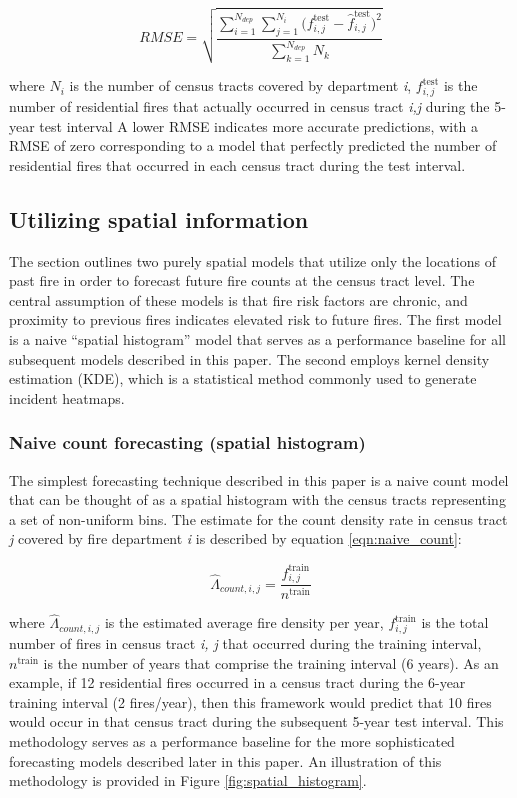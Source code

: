 \documentclass{svjour3}
\begin{document}
\begin{equation}
  \label{eqn:deviance}
  RMSE = \sqrt{
  \frac{\sum_{i=1}^{N_{dep}}\sum_{j=1}^{N_i}\bigg(
  f^{\text{test}}_{i,j} - \hat{f}^{\text{test}}_{i,j}\bigg)^2}{\sum_{k=1}^{N_{dep}}{N_k}}}
\end{equation}

\noindent where $N_i$ is the number of census tracts covered by department \textit{i}, $f^{\text{test}}_{i,j}$ is the number of residential fires that actually occurred in census tract \textit{i,j} during the 5-year test interval A lower RMSE indicates more accurate predictions, with a RMSE of zero corresponding to a model that perfectly predicted the number of residential fires that occurred in each census tract during the test interval.


\subsection{Utilizing spatial information}
The section outlines two purely spatial models that utilize only the locations of past fire in order to forecast future fire counts at the census tract level. The central assumption of these models is that fire risk factors are chronic, and proximity to previous fires indicates elevated risk to future fires. The first model is a naive ``spatial histogram'' model that serves as a performance baseline for all subsequent models described in this paper. The second employs kernel density estimation (KDE), which is a statistical method commonly used to generate incident heatmaps. 

\subsubsection{Naive count forecasting (spatial histogram)}
\label{countmodel}
The simplest forecasting technique described in this paper is a naive count model that can be thought of as a spatial histogram with the census tracts representing a set of non-uniform bins. The estimate for the count density rate in census tract \textit{j} covered by fire department \textit{i} is described by equation \ref{eqn:naive_count}:

\begin{equation}
  \label{eqn:naive_count}
  \hat{\Lambda}_{count,i,j} = \frac{f^{\text{train}}_{i,j}}{n^{\text{train}}} 
\end{equation}

\noindent where $\hat{\Lambda}_{count,i,j}$ is the estimated average fire density per year, $f^{\text{train}}_{i,j}$ is the total number of fires in census tract \textit{i, j} that occurred during the training interval, $n^{\text{train}}$ is the number of years that comprise the training interval (6 years). As an example, if 12 residential fires occurred in a census tract during the 6-year training interval (2 fires/year), then this framework would predict that 10 fires would occur in that census tract during the subsequent 5-year test interval. This methodology serves as a performance baseline for the more sophisticated forecasting models described later in this paper. An illustration of this methodology is provided in Figure \ref{fig:spatial_histogram}. 
\end{document}
